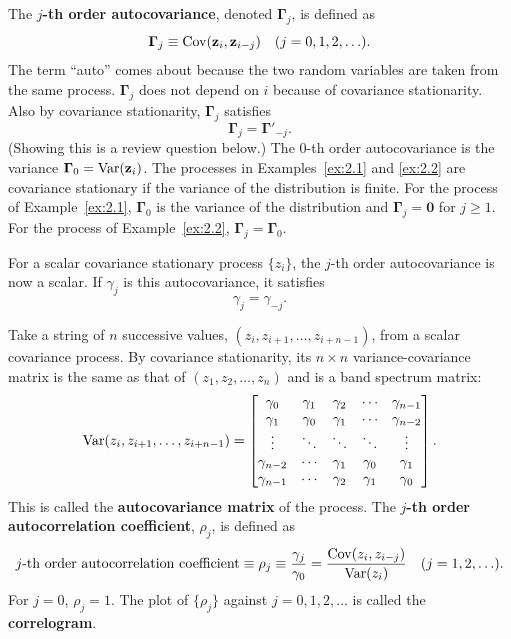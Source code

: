 The \textbf{$j$-th order autocovariance}, denoted $\bm{\Gamma}_j$, is defined as
\[
  \bm{\Gamma}_j \equiv \operatorname{Cov}(\mathbf{z}_i, \mathbf{z}_{i-j})
  \quad (j = 0, 1, 2, \ldots).
\]
The term ``auto'' comes about because the two random variables are taken from the
same process.  $\bm{\Gamma}_j$ does not depend on $i$ because of covariance
stationarity.  Also by covariance stationarity, $\bm{\Gamma}_j$ satisfies
\begin{equation}
  \bm{\Gamma}_j = \bm{\Gamma}'_{-j}.
  \label{eq:2.2.1}
\end{equation}
(Showing this is a review question below.)  The 0-th order autocovariance is the
variance $\bm{\Gamma}_0 = \operatorname{Var}(\mathbf{z}_i)$.  The processes in
Examples~\ref{ex:2.1} and \ref{ex:2.2} are covariance stationary if the variance of
the distribution is finite.  For the process of Example~\ref{ex:2.1},
$\bm{\Gamma}_0$ is the variance of the distribution and $\bm{\Gamma}_j = \mathbf{0}$
for $j \geq 1$.  For the process of Example~\ref{ex:2.2},
$\bm{\Gamma}_j = \bm{\Gamma}_0$.

For a scalar covariance stationary process $\{z_i\}$, the $j$-th order autocovariance
is now a scalar.  If $\gamma_j$ is this autocovariance, it satisfies
\begin{equation}
  \gamma_j = \gamma_{-j}.
  \label{eq:2.2.2}
\end{equation}

Take a string of $n$ successive values, $(z_i, z_{i+1}, \ldots, z_{i+n-1})$, from a
scalar covariance process.  By covariance stationarity, its $n \times n$
variance-covariance matrix is the same as that of $(z_1, z_2, \ldots, z_n)$ and is a
band spectrum matrix:
\[
  \operatorname{Var}(z_i, z_{i+1}, \ldots, z_{i+n-1})
  = \begin{bmatrix}
      \gamma_0    & \gamma_1    & \gamma_2 & \cdots & \gamma_{n-1} \\
      \gamma_1    & \gamma_0    & \gamma_1 & \cdots & \gamma_{n-2} \\
      \vdots      & \ddots      & \ddots   & \ddots & \vdots       \\
      \gamma_{n-2}& \cdots      & \gamma_1 & \gamma_0 & \gamma_1   \\
      \gamma_{n-1}& \cdots      & \gamma_2 & \gamma_1 & \gamma_0
    \end{bmatrix}.
\]
This is called the \textbf{autocovariance matrix} of the process.  The
\textbf{$j$-th order autocorrelation coefficient}, $\rho_j$, is defined as
\begin{equation}
  j\text{-th order autocorrelation coefficient}
  \equiv \rho_j
  \equiv \frac{\gamma_j}{\gamma_0}
  = \frac{\operatorname{Cov}(z_i, z_{i-j})}{\operatorname{Var}(z_i)}
  \quad (j = 1, 2, \ldots).
  \label{eq:2.2.3}
\end{equation}
For $j = 0$, $\rho_j = 1$.  The plot of $\{\rho_j\}$ against
$j = 0, 1, 2, \ldots$ is called the \textbf{correlogram}.

